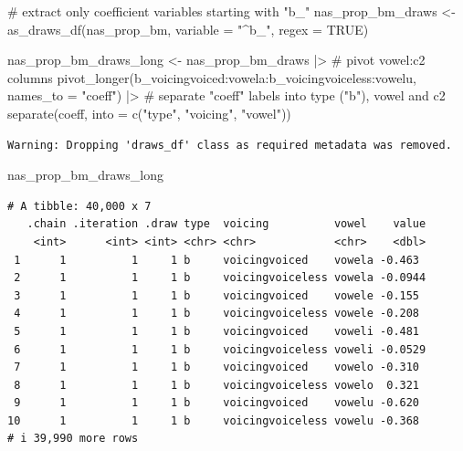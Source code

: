 \documentclass[
  authoryear,
  preprint,
  3p]{elsarticle}
\newenvironment{Shaded}{\begin{snugshade}}{\end{snugshade}}
\newcommand{\AttributeTok}[1]{\textcolor[rgb]{0.40,0.45,0.13}{#1}}
\newcommand{\CommentTok}[1]{\textcolor[rgb]{0.37,0.37,0.37}{#1}}
\newcommand{\ConstantTok}[1]{\textcolor[rgb]{0.56,0.35,0.01}{#1}}
\newcommand{\FunctionTok}[1]{\textcolor[rgb]{0.28,0.35,0.67}{#1}}
\newcommand{\NormalTok}[1]{\textcolor[rgb]{0.00,0.23,0.31}{#1}}
\newcommand{\OtherTok}[1]{\textcolor[rgb]{0.00,0.23,0.31}{#1}}
\newcommand{\SpecialCharTok}[1]{\textcolor[rgb]{0.37,0.37,0.37}{#1}}
\newcommand{\StringTok}[1]{\textcolor[rgb]{0.13,0.47,0.30}{#1}}
\begin{document}
\begin{Shaded}
\begin{Highlighting}[]
\CommentTok{\# extract only coefficient variables starting with "b\_"}
\NormalTok{nas\_prop\_bm\_draws }\OtherTok{\textless{}{-}} \FunctionTok{as\_draws\_df}\NormalTok{(nas\_prop\_bm, }\AttributeTok{variable =} \StringTok{"\^{}b\_"}\NormalTok{, }\AttributeTok{regex =} \ConstantTok{TRUE}\NormalTok{)}

\NormalTok{nas\_prop\_bm\_draws\_long }\OtherTok{\textless{}{-}}\NormalTok{ nas\_prop\_bm\_draws }\SpecialCharTok{|\textgreater{}} 
  \CommentTok{\# pivot vowel:c2 columns}
  \FunctionTok{pivot\_longer}\NormalTok{(}\StringTok{\textasciigrave{}}\AttributeTok{b\_voicingvoiced:vowela}\StringTok{\textasciigrave{}}\SpecialCharTok{:}\StringTok{\textasciigrave{}}\AttributeTok{b\_voicingvoiceless:vowelu}\StringTok{\textasciigrave{}}\NormalTok{, }\AttributeTok{names\_to =} \StringTok{"coeff"}\NormalTok{) }\SpecialCharTok{|\textgreater{}}
  \CommentTok{\# separate "coeff" labels into type ("b"), vowel and c2}
  \FunctionTok{separate}\NormalTok{(coeff, }\AttributeTok{into =} \FunctionTok{c}\NormalTok{(}\StringTok{"type"}\NormalTok{, }\StringTok{"voicing"}\NormalTok{, }\StringTok{"vowel"}\NormalTok{))}
\end{Highlighting}
\end{Shaded}

\begin{verbatim}
Warning: Dropping 'draws_df' class as required metadata was removed.
\end{verbatim}

\begin{Shaded}
\begin{Highlighting}[]
\NormalTok{nas\_prop\_bm\_draws\_long}
\end{Highlighting}
\end{Shaded}

\begin{verbatim}
# A tibble: 40,000 x 7
   .chain .iteration .draw type  voicing          vowel    value
    <int>      <int> <int> <chr> <chr>            <chr>    <dbl>
 1      1          1     1 b     voicingvoiced    vowela -0.463 
 2      1          1     1 b     voicingvoiceless vowela -0.0944
 3      1          1     1 b     voicingvoiced    vowele -0.155 
 4      1          1     1 b     voicingvoiceless vowele -0.208 
 5      1          1     1 b     voicingvoiced    voweli -0.481 
 6      1          1     1 b     voicingvoiceless voweli -0.0529
 7      1          1     1 b     voicingvoiced    vowelo -0.310 
 8      1          1     1 b     voicingvoiceless vowelo  0.321 
 9      1          1     1 b     voicingvoiced    vowelu -0.620 
10      1          1     1 b     voicingvoiceless vowelu -0.368 
# i 39,990 more rows
\end{verbatim}
\end{document}
